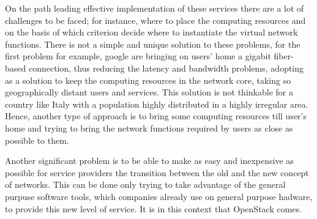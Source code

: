On the path leading effective implementation of these services there are a lot of challenges to be faced; for instance, where to place the computing resources and on the basis of which criterion decide where to instantiate the virtual network functions. There is not a simple and unique solution to these problems, for the first problem for example, google are bringing on users' home a gigabit fiber-based connection, thus reducing the latency and bandwidth problems, adopting as a solution to keep the computing resources in the network core, taking so geographically distant users and services. This solution is not thinkable for a country like Italy with a population highly distributed in a highly irregular area. Hence, another type of approach is to bring some computing resources till user's home and trying to bring the network functions required by users as close as possible to them. 

Another significant problem is to be able to make as easy and inexpensive as possible for service providers the transition between the old and the new concept of networks. This can be done only trying to take advantage of the general purpuse software tools, which companies already use on general purpose hadware, to provide this new level of service. It is in this context that OpenStack comes.


